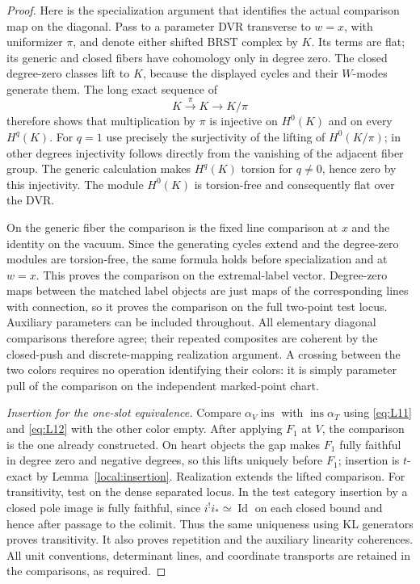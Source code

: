 \begin{proof}
Here is the specialization argument that identifies the actual
comparison map on the diagonal.  Pass to a parameter DVR transverse
to $w=x$, with uniformizer $\pi$, and denote either shifted BRST
complex by $K$.  Its terms are flat; its generic and closed fibers
have cohomology only in degree zero.  The closed degree-zero
classes lift to $K$, because the displayed cycles and their
$W$-modes generate them.  The long exact sequence of
\[
                      K\xrightarrow{\pi}K\longrightarrow K/\pi
\]
therefore shows that multiplication by $\pi$ is injective on
$H^0(K)$ and on every $H^q(K)$.  For $q=1$ use precisely the
surjectivity of the lifting of $H^0(K/\pi)$; in other degrees
injectivity follows directly from the vanishing of the adjacent
fiber group.  The generic calculation makes $H^q(K)$ torsion
for $q\ne0$, hence zero by this injectivity.  The module $H^0(K)$
is torsion-free and consequently flat over the DVR.

On the generic fiber the comparison is the fixed line comparison
at $x$ and the identity on the vacuum.  Since the generating cycles
extend and the degree-zero modules are torsion-free, the same
formula holds before specialization and at $w=x$.  This proves
the comparison on the extremal-label vector.  Degree-zero maps
between the matched label objects are just maps of the
corresponding lines with connection, so it proves the comparison
on the full two-point test locus.  Auxiliary parameters can be
included throughout.  All elementary diagonal comparisons
therefore agree; their repeated composites are coherent by the
closed-push and discrete-mapping realization argument.  A crossing
between the two colors requires no operation identifying their
colors: it is simply parameter pull of the comparison on the
independent marked-point chart.

\smallskip
\noindent\emph{Insertion for the one-slot equivalence.}
Compare $\alpha_V\operatorname{ins}$ with
$\operatorname{ins}\alpha_T$ using \eqref{eq:L11} and
\eqref{eq:L12} with the other color empty.  After applying $F_1$
at $V$, the comparison is the one already constructed.  On heart
objects the gap makes $F_1$ fully faithful in degree zero and
negative degrees, so this lifts uniquely before $F_1$; insertion
is $t$-exact by Lemma~\ref{local:insertion}.  Realization extends
the lifted comparison.  For transitivity, test on the dense
separated locus.  In the test category insertion by a closed
pole image is fully faithful, since $i^!i_*\simeq\operatorname{Id}$
on each closed bound and hence after passage to the colimit.
Thus the same uniqueness using KL generators proves transitivity.
It also proves repetition and the auxiliary linearity coherences.
All unit conventions, determinant lines, and coordinate transports
are retained in the comparisons, as required.
\end{proof}
